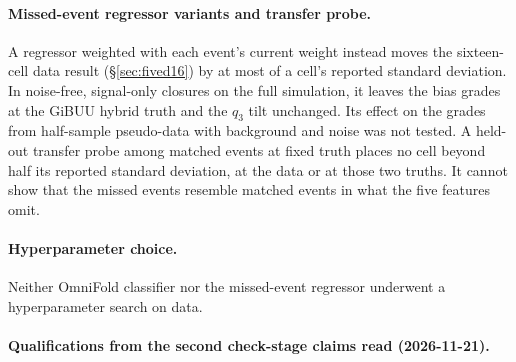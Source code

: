 \paragraph{Missed-event regressor variants and transfer probe.} A regressor weighted with each event's current weight instead moves the sixteen-cell data result (\S\ref{sec:fived16}) by at most  of a cell's reported standard deviation. In noise-free, signal-only closures on the full simulation, it leaves the bias grades at the GiBUU hybrid truth and the $q_3$ tilt unchanged. Its effect on the grades from half-sample pseudo-data with background and noise was not tested. A held-out transfer probe among matched events at fixed truth places no cell beyond half its reported standard deviation, at the data or at those two truths. It cannot show that the missed events resemble matched events in what the five features omit.

\paragraph{Hyperparameter choice.} Neither OmniFold classifier nor the missed-event regressor underwent a hyperparameter search on data.

\paragraph{Qualifications from the second check-stage claims read (2026-11-21).}

